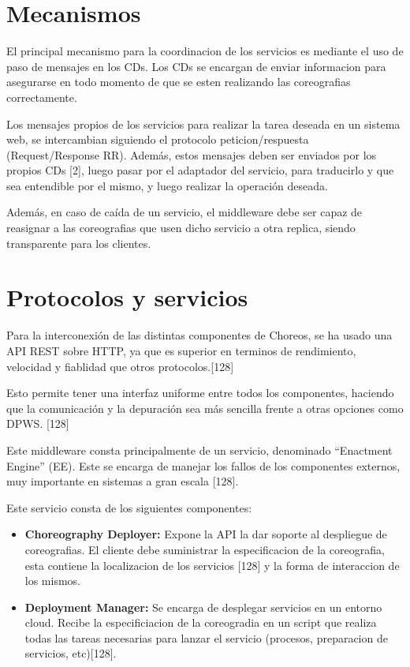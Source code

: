 \documentclass[runningheads]{llncs}
\begin{document}
\section{Mecanismos}
El principal mecanismo para la coordinacion de los servicios es mediante el uso de paso de mensajes en los CDs. Los CDs se encargan de enviar informacion para asegurarse en todo momento de que se esten realizando las coreografias correctamente. 

Los mensajes propios de los servicios para realizar la tarea deseada en un sistema web, se intercambian siguiendo el protocolo peticion/respuesta (Request/Response RR). Además, estos mensajes deben ser enviados por los propios CDs [2], luego pasar por el adaptador del servicio, para traducirlo y que sea entendible por el mismo, y luego realizar la operación deseada.

Además, en caso de caída de un servicio, el middleware debe ser capaz de reasignar a las coreografias que usen dicho servicio a otra replica, siendo transparente para los clientes.
\section{Protocolos y servicios}
Para la interconexión de las distintas componentes de Choreos, se ha usado una API REST sobre HTTP, ya que es superior en terminos de rendimiento, velocidad y fiablidad que otros protocolos.[128]

Esto permite tener una interfaz uniforme entre todos los componentes, haciendo que la comunicación y la depuración sea más sencilla frente a otras opciones como DPWS. [128]

Este middleware consta principalmente de un servicio, denominado ``Enactment Engine'' (EE). Este se encarga de manejar los fallos de los componentes externos, muy importante en sistemas a gran escala [128].

Este servicio consta de los siguientes componentes:

\begin{itemize}
    \item \textbf{Choreography Deployer: }Expone la API la dar soporte al despliegue de coreografias. El cliente debe suministrar la especificacion de la coreografia, esta contiene la localizacion de los servicios [128] y la forma de interaccion de los mismos.
    \item \textbf{Deployment Manager: }Se encarga de desplegar servicios en un entorno cloud. Recibe la especificiacion de la coreogradia en un script que realiza todas las tareas necesarias para lanzar el servicio (procesos, preparacion de servicios, etc)[128].
\end{itemize}
\end{document}

